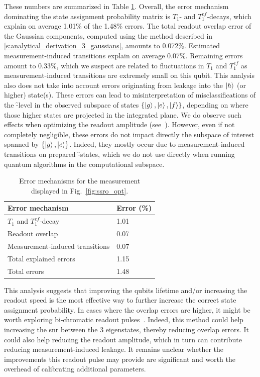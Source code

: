 These numbers are summarized in Table \ref{tab:error_mechanisms}. Overall, the error mechanism dominating the state assignment probability matrix is $T_1$- and $T_1^{ef}$-decays, which explain on average 1.01\% of the 1.48\% errors. The total readout overlap error of the Gaussian components, computed using the method described in  \ref{s:analytical_derivation_3_gaussians}, amounts to 0.072\%. Estimated measurement-induced transitions explain on average 0.07\%. Remaining errors amount to 0.33\%, which we suspect are related to fluctuations in $T_1$ and $T_1^{ef}$ as measurement-induced transitions are extremely small on this qubit. This analysis also does not take into account errors originating from leakage into the $\ket{h}$ (or higher) state(s). These errors can lead to misinterpretation of misclassifications of the \f-level in the observed subspace of states $\{\ket{g}, \ket{e}, \ket{f}\}$, depending on where those higher states are projected in the integrated plane. We do observe such effects when optimizing the readout amplitude (see~\cite[Appendix B, Fig.~11]{Lacroix2019}). However, even if not completely negligible, these errors do not impact directly the subspace of interest spanned by $\{\ket{g}, \ket{e}\}$. Indeed, they mostly occur due to measurement-induced transitions on prepared \f-states, which we do not use directly when running quantum algorithms in the computational subspace. 

\begin{table}[ht]
\centering
\caption{Error mechanisms for the measurement displayed in Fig.~\ref{fig:ssro_opt}.}
\begin{tabularx}{0.65\textwidth}{ll}
\toprule 
\textbf{Error mechanism} & \textbf{Error (\%)} \\
\midrule
    $T_1$ and $T_1^{ef}$-decay & 1.01 \\
    Readout overlap & 0.07\\
    Measurement-induced transitions &  0.07 \\
    \midrule
    Total explained errors & 1.15  \\
    \midrule
    Total errors & 1.48 \\
\bottomrule
\end{tabularx}
\label{tab:error_mechanisms}
\end{table}

This analysis suggests that improving the qubits lifetime and/or increasing the readout speed is the most effective way to further increase the correct state assignment probability. In cases where the overlap errors are higher, it might be worth exploring  bi-chromatic readout pulses~\cite{Collodo2020}. Indeed, this method could help increasing the \gls{snr} between the 3 eigenstates, thereby reducing overlap errors. It could also help reducing the readout amplitude, which in turn can contribute reducing measurement-induced leakage. It remains unclear whether the improvements this readout pulse may provide are significant and worth the overhead of calibrating additional parameters.

